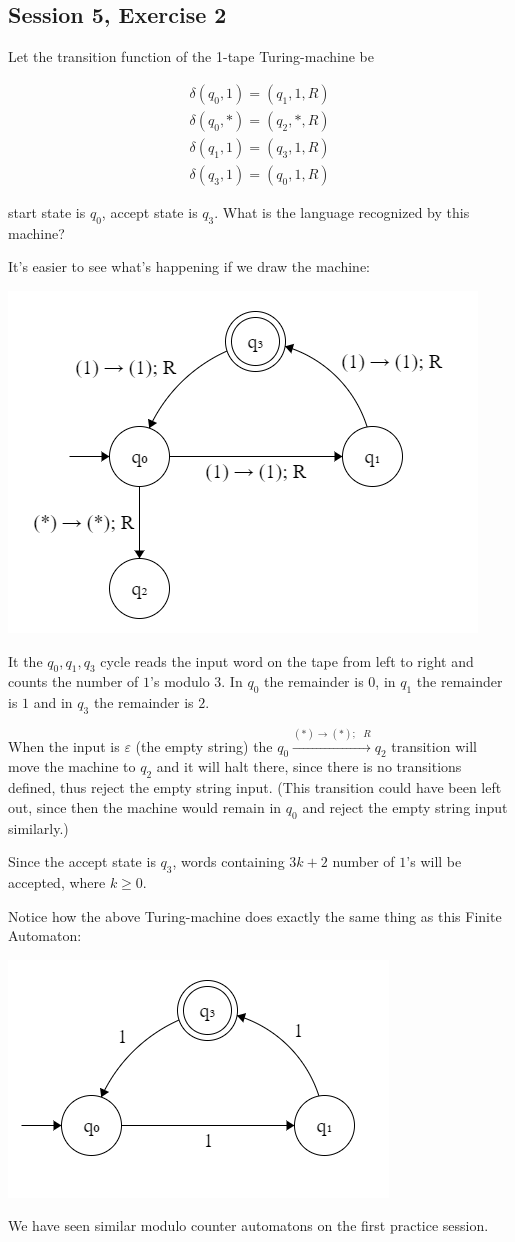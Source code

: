 \subsection {Session 5, Exercise 2}


Let the transition function of the 1-tape Turing-machine be

\begin{align*}
    \delta(q_0,1) = (q_1,1,R)\\
    \delta(q_0,*) = (q_2,*,R)\\
    \delta(q_1,1) = (q_3,1,R)\\
    \delta(q_3,1) = (q_0,1,R)
\end{align*}


start state is $q_0$, accept state is $q_3$. What is the language recognized by this machine?


It's easier to see what's happening if we draw the machine:

\includegraphics[width=0.5\linewidth]{05/6_2.png}

It the $q_0, q_1, q_3$ cycle reads the input word on the tape from left to right and counts the number of $1$'s modulo $3$. In $q_0$ the remainder is $0$, in $q_1$ the remainder is $1$ and in $q_3$ the remainder is $2$.

When the input is $\varepsilon$ (the empty string) the $q_0 \xrightarrow{(*) \rightarrow (*);\text{ }R} q_2$ transition will move the machine to $q_2$ and it will halt there, since there is no transitions defined, thus reject the empty string input. (This transition could have been left out, since then the machine would remain in $q_0$ and reject the empty string input similarly.)

Since the accept state is $q_3$, words containing $3k+2$ number of $1$'s will be accepted, where $k\geq{}0$.

Notice how the above Turing-machine does exactly the same thing as this Finite Automaton:

\includegraphics[width=0.6\linewidth]{05/6_2_b.png}

We have seen similar modulo counter automatons on the first practice session.